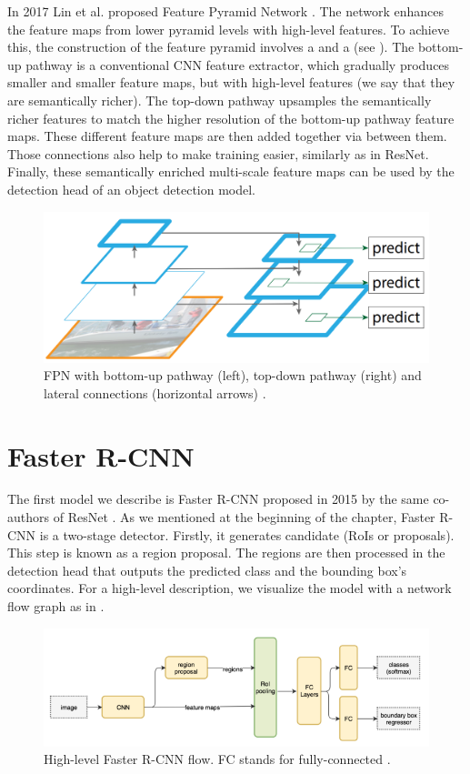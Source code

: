 In 2017 Lin et al. proposed Feature Pyramid Network \cite{fpn}. The
network enhances the feature maps from lower pyramid levels with
high-level features. To achieve this, the construction of the feature
pyramid involves a  and a 
(see ). The bottom-up pathway is a conventional CNN
feature extractor, which gradually produces smaller and smaller feature maps,
but with high-level features (we say that they are semantically richer). The
top-down pathway upsamples the semantically richer features to match the
higher resolution of the bottom-up pathway feature maps. These different
feature maps are then added together via  between
them. Those connections also help to make training easier, similarly as
in ResNet.  Finally, these semantically enriched multi-scale feature maps
can be used by the detection head of an object detection model.

\begin{figure}[h]
    \centering
    \includegraphics[width=0.6\linewidth]{Sources/Figures/fpn.png}
    \caption{FPN with bottom-up pathway (left), top-down pathway (right) and
        lateral connections (horizontal arrows) \cite{fpn}.}
    \label{fig:fpn}
\end{figure}

\section{Faster R-CNN}
The first model we describe is Faster R-CNN proposed in 2015 by the same
co-authors of ResNet \cite{fasterrcnn}. As we mentioned at the beginning
of the chapter, Faster R-CNN is a two-stage detector. Firstly, it generates
candidate  (RoIs or proposals). This step is known
as a region proposal. The regions are then processed in the detection head
that outputs the predicted class and the bounding box's coordinates. For a
high-level description, we visualize the model with a network flow graph as
in .

\begin{figure}[h]
    \centering
    \includegraphics[width=\linewidth]{Sources/Figures/fasterrcnn.png}
    \caption{High-level Faster R-CNN flow. FC stands for fully-connected
        \cite{huifasterrcnn}.}
    \label{fig:fasterrcnn}
\end{figure}


